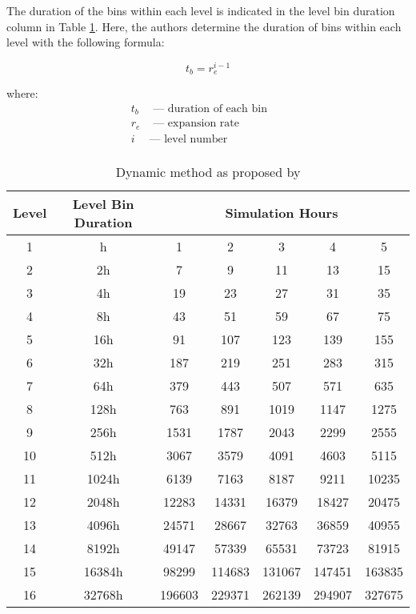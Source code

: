 \documentclass[review,12pt]{elsarticle}
\begin{document}
The duration of the bins within each level is indicated in the level bin duration column in Table \ref{tab:claesson example}. Here, the authors determine the duration of bins within each level with the following formula:

\begin{equation}
	t_b = r_e^{i - 1}
\end{equation}

where:
\begin{align*}
    t_b & \mbox{ --- duration of each bin} && \\
    r_e & \mbox{ --- expansion rate} && \\
    i & \mbox{--- level number} && \\
\end{align*}

\begin{table}[htbp!]
\centering
\caption{Dynamic method as proposed by \cite{ClaessonJaved2012}}
\label{tab:claesson example}
\begin{tabular}{|c|c|c|c|c|c|c|}
\hline
Level & Level Bin Duration & \multicolumn{5}{c|}{Simulation Hours}      \\ \hline
1     & h                  & 1      & 2      & 3      & 4      & 5      \\ \hline
2     & 2h                 & 7      & 9      & 11     & 13     & 15     \\ \hline
3     & 4h                 & 19     & 23     & 27     & 31     & 35     \\ \hline
4     & 8h                 & 43     & 51     & 59     & 67     & 75     \\ \hline
5     & 16h                & 91     & 107    & 123    & 139    & 155    \\ \hline
6     & 32h                & 187    & 219    & 251    & 283    & 315    \\ \hline
7     & 64h                & 379    & 443    & 507    & 571    & 635    \\ \hline
8     & 128h               & 763    & 891    & 1019   & 1147   & 1275   \\ \hline
9     & 256h               & 1531   & 1787   & 2043   & 2299   & 2555   \\ \hline
10    & 512h               & 3067   & 3579   & 4091   & 4603   & 5115   \\ \hline
11    & 1024h              & 6139   & 7163   & 8187   & 9211   & 10235  \\ \hline
12    & 2048h              & 12283  & 14331  & 16379  & 18427  & 20475  \\ \hline
13    & 4096h              & 24571  & 28667  & 32763  & 36859  & 40955  \\ \hline
14    & 8192h              & 49147  & 57339  & 65531  & 73723  & 81915  \\ \hline
15    & 16384h             & 98299  & 114683 & 131067 & 147451 & 163835 \\ \hline
16    & 32768h             & 196603 & 229371 & 262139 & 294907 & 327675 \\ \hline
\end{tabular}
\end{table}
\end{document}
